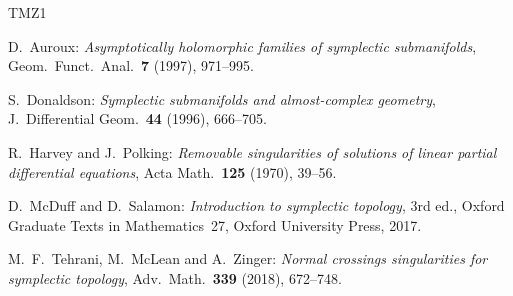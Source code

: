 \documentclass[11pt]{amsart}
\numberwithin{equation}{section}
\theoremstyle{plain}
\theoremstyle{definition}
\begin{document}
\begin{thebibliography}{TMZ1}

D.~Auroux:
\emph{Asymptotically holomorphic families of symplectic submanifolds},
Geom.\ Funct.\ Anal.~\textbf{7} (1997), 971--995.

S.~Donaldson:
\emph{Symplectic submanifolds and almost-complex geometry},
J.\ Differential Geom.~\textbf{44} (1996), 666--705.

R.~Harvey and J.~Polking:
\emph{Removable singularities of solutions of linear partial differential
equations},
Acta Math.~\textbf{125} (1970), 39--56.

D.~McDuff and D.~Salamon:
\emph{Introduction to symplectic topology},
3rd ed., Oxford Graduate Texts in Mathematics~27,
Oxford University Press, 2017.

M.~F.~Tehrani, M.~McLean and A.~Zinger:
\emph{Normal crossings singularities for symplectic topology},
Adv.\ Math.~\textbf{339} (2018), 672--748.

\end{thebibliography}
\end{document}
